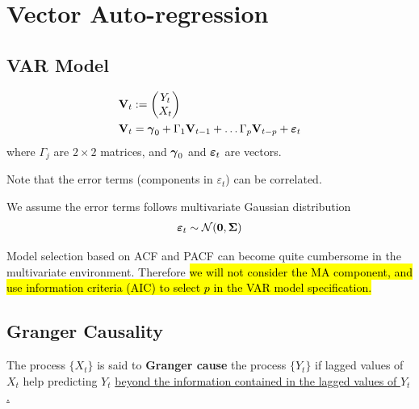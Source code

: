 \documentclass[11pt]{article}
\begin{document}
	\section{Vector Auto-regression}
	    \subsection{VAR Model}
            \begin{definition}
                \begin{align}
                    \textbf{V}_t &:= \begin{pmatrix}Y_t \\ X_t \end{pmatrix} \\
                    \textbf{V}_t &= \boldsymbol{\gamma}_0 + \Gamma_1 \textbf{V}_{t-1} + \dots \Gamma_p \textbf{V}_{t-p} + \boldsymbol{\varepsilon}_t
                \end{align}
                where $\Gamma_j$ are $2 \times 2$ matrices, and $\boldsymbol{\gamma}_0$ and $\boldsymbol{\varepsilon}_t$ are vectors.
            \end{definition}
            
            \begin{remark}
                Note that the error terms (components in $\varepsilon_t$) can be correlated.
            \end{remark}
            
            \begin{remark}
                We assume the error terms follows multivariate Gaussian distribution
                \begin{gather}
                    \boldsymbol{\varepsilon}_t \sim \mathcal{{N}}(\textbf{0}, \boldsymbol{\Sigma})
                \end{gather}
            \end{remark}
            
            \begin{remark}
                Model selection based on ACF and PACF can become quite cumbersome in the multivariate environment. Therefore \hl{we will not consider the MA component, and use information criteria (AIC) to select $p$ in the VAR model specification.}
    	    \end{remark}
    	    
        \subsection{Granger Causality}
            \begin{definition}
                The process $\{X_t\}$ is said to \textbf{Granger cause} the process $\{Y_t\}$ if lagged values of $X_t$ help predicting $Y_t$ \ul{beyond the information contained in the lagged values of $Y_t$.}
            \end{definition}
            
\end{document}
